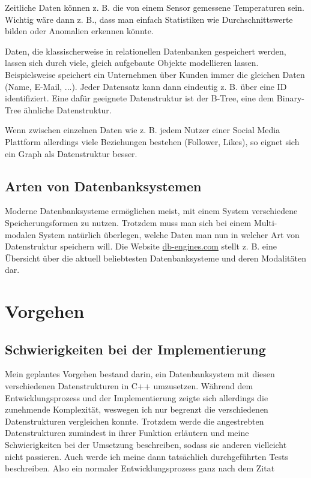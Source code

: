\documentclass[11pt,a4paper]{article}
\begin{document}
\vspace*{0.3cm}

Zeitliche Daten können z. B. die von einem Sensor gemessene Temperaturen sein.
Wichtig wäre dann z. B., dass man einfach Statistiken wie Durchschnittswerte bilden
oder Anomalien erkennen könnte.

\vspace*{0.3cm}

Daten, die klassischerweise in relationellen Datenbanken gespeichert werden,
lassen sich durch viele, gleich aufgebaute Objekte modellieren lassen.
Beispielsweise speichert ein Unternehmen über Kunden immer die gleichen Daten
(Name, E-Mail, ...). Jeder Datensatz kann dann eindeutig z. B. über eine
ID identifiziert. Eine dafür geeignete Datenstruktur ist der B-Tree, eine
dem Binary-Tree ähnliche Datenstruktur.

\vspace*{0.3cm}

Wenn zwischen einzelnen Daten wie z. B. jedem Nutzer einer Social Media Plattform
allerdings viele Beziehungen bestehen (Follower, Likes), so eignet sich ein Graph
als Datenstruktur besser.

\subsection{Arten von Datenbanksystemen}

Moderne Datenbanksysteme ermöglichen meist, mit einem System verschiedene
Speicherungsformen zu nutzen. Trotzdem muss man sich bei einem Multi-modalen System
natürlich überlegen, welche Daten man nun in welcher Art von Datenstruktur speichern
will. Die Website \href{https://db-engines.com/en/ranking}{db-engines.com} stellt z. B.
eine Übersicht über die aktuell beliebtesten Datenbanksysteme und deren Modalitäten dar.

\section{Vorgehen}

\subsection{Schwierigkeiten bei der Implementierung}

Mein geplantes Vorgehen bestand darin, ein Datenbanksystem mit diesen
verschiedenen Datenstrukturen in C++ umzusetzen.
Während dem Entwicklungsprozess und der Implementierung zeigte sich allerdings die
zunehmende Komplexität, weswegen ich nur begrenzt die verschiedenen Datenstrukturen
vergleichen konnte. Trotzdem werde die angestrebten Datenstrukturen
zumindest in ihrer Funktion erläutern und meine Schwierigkeiten bei der Umsetzung
beschreiben, sodass sie anderen vielleicht nicht passieren.
Auch werde ich meine dann tatsächlich durchgeführten Tests beschreiben.
Also ein normaler Entwicklungsprozess ganz nach dem Zitat
\end{document}
